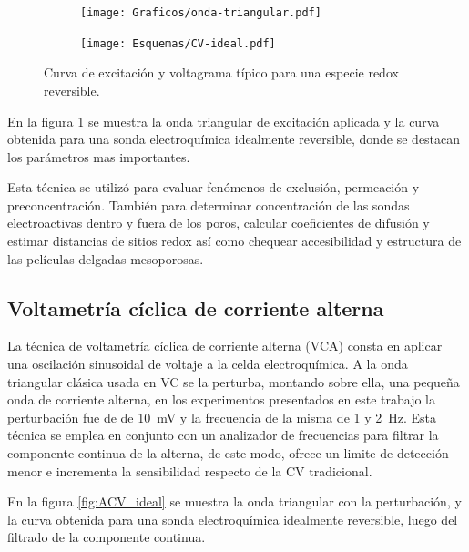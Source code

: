 	 			 \begin{figure}[h!]
			  		  \begin{subfigure}[t]{0.495\textwidth}
			  		  \texttt{[image: Graficos/onda-triangular.pdf]}
			  		  \end{subfigure}
			  		  \begin{subfigure}[t]{0.495\textwidth}
			  		  \texttt{[image: Esquemas/CV-ideal.pdf]}
			  		  \end{subfigure}
			  		  \caption[Voltamperometría ideal reversible]{Curva de excitación y voltagrama típico para una especie redox reversible.}
			  		  \label{fig:CV_ideal}
			  		  \end{figure}

	 		En la figura \ref{fig:CV_ideal} se muestra la onda triangular de excitación aplicada y la curva obtenida para una sonda electroquímica idealmente reversible, donde se destacan los parámetros mas importantes.
	 		
	 		Esta técnica se utilizó para evaluar fenómenos de exclusión, permeación y preconcentración. También para determinar concentración de las sondas electroactivas dentro y fuera de los poros, calcular coeficientes de difusión y estimar distancias de sitios redox así como chequear accesibilidad y estructura de las películas delgadas mesoporosas.


	 		

	 \subsection{Voltametría cíclica de corriente alterna}

	 		La técnica de voltametría cíclica de corriente alterna (VCA) consta en aplicar una oscilación sinusoidal de voltaje a la celda electroquímica. A la onda triangular clásica usada en VC se la perturba, montando sobre ella, una pequeña onda de corriente alterna, en los experimentos presentados en este trabajo la perturbación fue de de \SI{10}{\milli\volt} y la frecuencia de la misma de 1 y \SI{2}{\hertz}. Esta técnica se emplea en conjunto con un analizador de frecuencias para filtrar la componente continua de la alterna, de este modo, ofrece un limite de detección menor e incrementa la sensibilidad respecto de la CV tradicional.\cite{Wi2000,Skoog1995}

	 		En la figura \ref{fig:ACV_ideal} se muestra la onda triangular con la perturbación, y la curva obtenida para una sonda electroquímica idealmente reversible, luego del filtrado de la componente continua.

